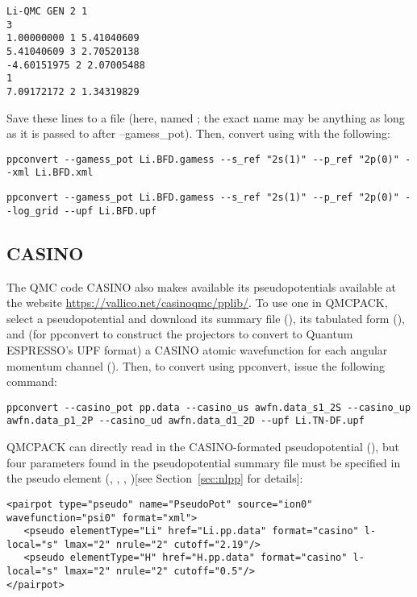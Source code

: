 \begin{lstlisting}[caption=BFD Li pseudopotential in GAMESS format]
Li-QMC GEN 2 1
3
1.00000000 1 5.41040609
5.41040609 3 2.70520138
-4.60151975 2 2.07005488
1
7.09172172 2 1.34319829
\end{lstlisting}
Save these lines to a file (here, named ; the exact name may be anything as long as it is passed to  after --gamess\_pot).  Then, convert using  with the following:
\begin{lstlisting}[caption=Convert GAMESS-formatted pseudopotential to FSAtom xml format]
  ppconvert --gamess_pot Li.BFD.gamess --s_ref "2s(1)" --p_ref "2p(0)" --xml Li.BFD.xml
\end{lstlisting}
\begin{lstlisting}[caption=Convert GAMESS-formatted pseudopotential to Quantum ESPRESSO UPF format]
  ppconvert --gamess_pot Li.BFD.gamess --s_ref "2s(1)" --p_ref "2p(0)" --log_grid --upf Li.BFD.upf
\end{lstlisting}

\subsection{CASINO}
\label{subsec:CASINO}
The QMC code CASINO also makes available its pseudopotentials available at the website \url{https://vallico.net/casinoqmc/pplib/}. To use one in QMCPACK, select a pseudopotential and download its summary file (), its tabulated form (), and (for ppconvert to construct the projectors to convert to Quantum ESPRESSO's UPF format) a CASINO atomic wavefunction for each angular momentum channel ().  Then, to convert using ppconvert, issue the following command:
\begin{lstlisting}[caption=Convert CASINO-formatted pseudopotential to Quantum ESPRESSO UPF format]
ppconvert --casino_pot pp.data --casino_us awfn.data_s1_2S --casino_up awfn.data_p1_2P --casino_ud awfn.data_d1_2D --upf Li.TN-DF.upf
\end{lstlisting}
QMCPACK can directly read in the CASINO-formated pseudopotential (), but four parameters found in the pseudopotential summary file must be specified in the pseudo element (, , , )[see Section~\ref{sec:nlpp} for details]:
\begin{lstlisting}[style=QMCPXML,caption=QMCPXML syntax to use CASINO-formatted pseudopotentials in QMCPACK]
<pairpot type="pseudo" name="PseudoPot" source="ion0" wavefunction="psi0" format="xml">
   <pseudo elementType="Li" href="Li.pp.data" format="casino" l-local="s" lmax="2" nrule="2" cutoff="2.19"/>
   <pseudo elementType="H" href="H.pp.data" format="casino" l-local="s" lmax="2" nrule="2" cutoff="0.5"/>
</pairpot>
\end{lstlisting}
